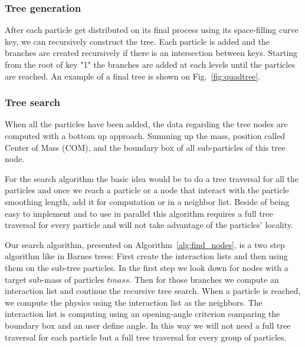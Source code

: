 \subsubsection{Tree generation}

After each particle get distributed on its final process using its space-filling curve key, we can recursively construct the tree.
Each particle is added and the branches are created recursively if there is an intersection between keys. 
Starting from the root of key "1" the branches are added at each levels until the particles are reached.
An example of a final tree is shown on Fig.~\ref{fig:quadtree}.

\subsubsection{Tree search}

When all the particles have been added, the data regarding the tree nodes are computed with a bottom up approach. 
Summing up the mass, position called Center of Mass (COM), and the boundary box of all sub-particles of this tree node.

For the search algorithm the basic idea would be to do a tree traversal for all the particles and once we reach a particle or a node that interact with the particle smoothing length, add it for computation or in a neighbor list. 
Beside of being easy to implement and to use in parallel this algorithm requires a full tree traversal for every particle and will not take advantage of the particles' locality.

Our search algorithm, presented on Algorithm~\ref{alg:find_nodes}, is a two step algorithm like in Barnes trees: First create the interaction lists and then using them on the sub-tree particles. 
In the first step we look down for nodes with a target sub-mass of particles $tmass$. 
Then for those branches we compute an interaction list and continue the recursive tree search. 
When a particle is reached, we compute the physics using the interaction list as the neighbors. 
The interaction list is computing using an opening-angle criterion comparing the boundary box and an user define angle. 
In this way we will not need a full tree traversal for each particle but a full tree traversal for every group of particles.

